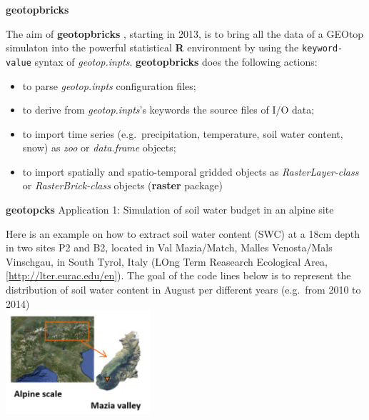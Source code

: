 \documentclass[ignorenonframetext,]{beamer}
\providecommand{\tightlist}{%
  \setlength{\itemsep}{0pt}\setlength{\parskip}{0pt}}
\begin{document}
\begin{frame}[fragile]{\textbf{geotopbricks}}

The aim of \textbf{geotopbricks} , starting in 2013, is to bring all the
data of a GEOtop simulaton into the powerful statistical \textbf{R}
environment by using the \texttt{keyword-value} syntax of
\emph{geotop.inpts}. \textbf{geotopbricks} does the following actions:

\begin{itemize}
\tightlist
\item
  to parse \emph{geotop.inpts} configuration files;
\item
  to derive from \emph{geotop.inpts}'s keywords the source files of I/O
  data;
\item
  to import time series (e.g.~precipitation, temperature, soil water
  content, snow) as \emph{zoo} or \emph{data.frame} objects;
\item
  to import spatially and spatio-temporal gridded objects as
  \emph{RasterLayer-class} or \emph{RasterBrick-class} objects
  (\textbf{raster} package)
\end{itemize}

\end{frame}

\begin{frame}{\textbf{geotopcks} Application 1: Simulation of soil water
budget in an alpine site}

Here is an example on how to extract soil water content (SWC) at a 18cm
depth in two sites P2 and B2, located in Val Mazia/Match, Malles
Venosta/Mals Vinschgau, in South Tyrol, Italy (LOng Term Reasearch
Ecological Area, {[}\url{http://lter.eurac.edu/en}{]}). The goal of the
code lines below is to represent the distribution of soil water content
in August per different years (e.g.~from 2010 to 2014)\\
\includegraphics[width=0.40000\textwidth]{resources/images/mazia_2.png}\\

\end{frame}
\end{document}

